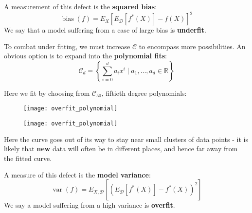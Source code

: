 \documentclass{beamer}
\DeclareMathOperator*{\bias}{bias}
\DeclareMathOperator*{\var}{var}
\begin{document}
%
\begin{frame}
  A measurement of this defect is the \textbf{squared bias}:
  $$ \bias(f) = E_X \left[ E_{\mathcal{D}}[f^*(X)] - f(X) \right] ^2$$
  We say that a model suffering from a case of large bias is \textbf{underfit}.
\end{frame}
%
\begin{frame}
  To combat under fitting, we must increase $\mathcal{C}$ to encompass more possibilities. An obvious option is to expand into the \textbf{polynomial fits}:
  $$\mathcal{C}_d = \left\{ \sum_{i=0}^{d} a_i x^i \mid a_1, \ldots, a_d \in \mathbb{R} \right\}$$
\end{frame}
%
\begin{frame}
  Here we fit by choosing from $\mathcal{C}_{50}$, fiftieth degree polynomials:
  \begin{figure}
    \texttt{[image: overfit\_polynomial]}
  \end{figure}
\end{frame}
%
\begin{frame}
  \begin{figure}
    \texttt{[image: overfit\_polynomial]}
  \end{figure}
  Here the curve goes out of its way to stay near small clusters of data points - it is likely that \textbf{new} data will often be in different places, and hence far away from the fitted curve.
\end{frame}
%
\begin{frame}
  A measure of this defect is the \textbf{model variance}:
  $$ \var(f) = E_{X, \mathcal{D}} \left[ (E_{\mathcal{D}}[f^*(X)] - f^*(X))^2 \right] $$
  We say a model suffering from a high variance is \textbf{overfit}.
\end{frame}
%
\end{document}
